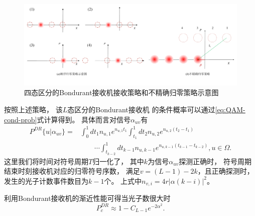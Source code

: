 \begin{figure}
\centering
  \includegraphics[width=\textwidth]{figures/chap3/Q-Bondurant-displacemet-strategy}
  \caption{四态区分的Bondurant接收机接收策略和不精确归零策略示意图}
  \label{fig:Q-Bondurant-displacemet-strategy}
\end{figure}

按照上述策略，
该$L$态区分的Bondurant接收机
的条件概率可以通过\ref{eq:QAM-cond-prob}式计算得到。
具体而言对信号$\alpha_{uv}$有
\begin{equation}
\begin{split}
P^{DR}\{u|\alpha_{uv}\} = & \int_0^1 dt_1 n_{u,1} e^{n_{u,1} t_1} \int_{t_1}^1 dt_2 n_{u,2} e^{n_{u,2} (t_2-t_1)}   \\
                          &\qquad \cdots \int_{t_{k-2}}^1 dt_{k-1} n_{u,k-1} e^{n_{u,k-1} (t_{k-1}-t_{k-2})}, u \in \Omega.
\end{split}
\label{eq:DR-cond-p}
\end{equation}
这里我们将时间对符号周期$T$归一化了，
其中$k$为信号$\alpha_{uv}$探测正确时，
符号周期结束时刻接收机对应的归零符号序数，
满足$v = (L-1) - 2k$，且正确探测时，发生的光子计数事件数目为$k-1$个。
上式中$n_{v,i} = 4r|\alpha(k-i)|^2 $。

利用Bondurant接收机的渐近性能可得当光子数很大时
\begin{equation}
P_c^{DR} \approx 1 - C_{L-1} e^{-2\alpha^2}.
\label{eq:QAM-Hybrid-approx-2}
\end{equation}

